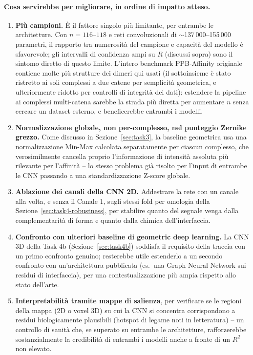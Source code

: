 \documentclass[11pt,a4paper]{article}
\begin{document}
\paragraph{Cosa servirebbe per migliorare, in ordine di impatto atteso.}
\begin{enumerate}
    \item \textbf{Più campioni.} È il fattore singolo più limitante, per entrambe le architetture. Con $n=116$--$118$ e reti convoluzionali di $\sim$137\,000--155\,000 parametri, il rapporto tra numerosità del campione e capacità del modello è sfavorevole; gli intervalli di confidenza ampi su $R$ (discussi sopra) sono il sintomo diretto di questo limite. L'intero benchmark PPB-Affinity originale contiene molte più strutture dei dimeri qui usati (il sottoinsieme è stato ristretto ai soli complessi a due catene per semplicità geometrica, e ulteriormente ridotto per controlli di integrità dei dati): estendere la pipeline ai complessi multi-catena sarebbe la strada più diretta per aumentare $n$ senza cercare un dataset esterno, e beneficerebbe entrambi i modelli.
    \item \textbf{Normalizzazione globale, non per-complesso, nel punteggio Zernike grezzo.} Come discusso in Sezione~\ref{sec:task3}, la baseline geometrica usa una normalizzazione Min-Max calcolata separatamente per ciascun complesso, che verosimilmente cancella proprio l'informazione di intensità assoluta più rilevante per l'affinità -- lo stesso problema già risolto per l'input di entrambe le CNN passando a una standardizzazione Z-score globale.
    \item \textbf{Ablazione dei canali della CNN 2D.} Addestrare la rete con un canale alla volta, e senza il Canale 1, sugli stessi fold per omologia della Sezione~\ref{sec:task4-robustness}, per stabilire quanto del segnale venga dalla complementarità di forma e quanto dalla chimica dell'interfaccia.
    \item \textbf{Confronto con ulteriori baseline di geometric deep learning.} La CNN 3D della Task 4b (Sezione~\ref{sec:task4b}) soddisfa il requisito della traccia con un primo confronto genuino; resterebbe utile estenderlo a un secondo confronto con un'architettura pubblicata (es.\ una Graph Neural Network sui residui di interfaccia), per una contestualizzazione più ampia rispetto allo stato dell'arte.
    \item \textbf{Interpretabilità tramite mappe di salienza}, per verificare se le regioni della mappa (2D o voxel 3D) su cui la CNN si concentra corrispondono a residui biologicamente plausibili (hotspot di legame noti in letteratura) -- un controllo di sanità che, se superato su entrambe le architetture, rafforzerebbe sostanzialmente la credibilità di entrambi i modelli anche a fronte di un $R^2$ non elevato.

\end{enumerate}
\end{document}
